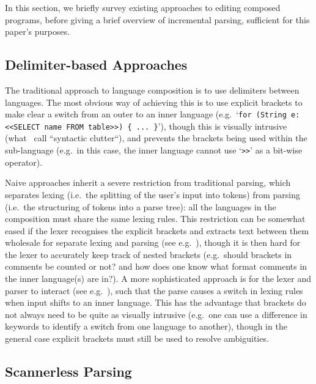 \documentclass[sigplan,screen]{acmart}
\begin{document}
In this section, we briefly survey existing approaches to editing composed
programs, before giving a brief overview of incremental parsing, sufficient for
this paper's purposes.


\subsection{Delimiter-based Approaches}

The traditional approach to language composition is to use delimiters
between languages. The
most obvious way of achieving this is to use explicit brackets to make clear a
switch from an outer to an inner language (e.g.~`\texttt{for (String e: <<SELECT name
FROM table>>) \{ ... \}}'), though this is visually intrusive
(what~\cite[p.~4]{bravenboer05generalized} call ``syntactic clutter``), and
prevents the
brackets being used within the sub-language (e.g.~in this case, the inner language
cannot use `\texttt{>>}' as a bit-wise operator).

Naive approaches inherit a severe restriction from traditional parsing, which
separates lexing (i.e.~the splitting of the user's input into tokens) from
parsing (i.e.~the structuring of tokens into a parse tree): all the languages
in the composition
must share the same lexing rules. This restriction can be somewhat eased if the
lexer recognises the explicit brackets and extracts text between them wholesale
for separate lexing and parsing (see e.g.~\cite[p.~13-14]{tratt08domainspecific}),
though it is then hard for the lexer to accurately keep track of nested
brackets (e.g.~should brackets in comments be counted or not? and how does
one know what format comments in the inner language(s) are in?).  A
more sophisticated approach is for the lexer and parser to interact (see
e.g.~\cite{wyk07context}), such that the parse causes a switch in lexing rules
when input shifts to an inner language.
This has the advantage that brackets do not always need to be quite as visually
intrusive (e.g.~one can use a difference in keywords to identify a switch from
one language to another), though in the general case explicit brackets must still be
used to resolve ambiguities.


\subsection{Scannerless Parsing}
\label{sec:scannerless}
\end{document}
